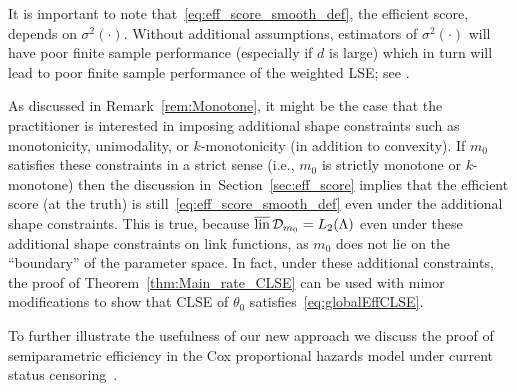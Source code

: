 { %


\begin{remark}\label{rem:Efficency_general} It is important to note that~\eqref{eq:eff_score_smooth_def}, the efficient score, depends on $\sigma^2(\cdot)$.  Without additional assumptions, estimators of $\sigma^2(\cdot)$  will have poor finite sample  performance (especially if $d$ is large) which in turn will lead to  poor finite sample performance of the weighted LSE; see \citet[pages 93-95]{Tsiatis06}. 
\end{remark}

\begin{remark}\label{rem:Efficency_additional}
As discussed in Remark~\ref{rem:Monotone}, it might be the case that the practitioner is interested in {imposing} additional shape constraints such as monotonicity, unimodality, or $k$-monotonicity (in addition to convexity). If $m_0$ satisfies these constraints {in a strict sense} (i.e., $m_0$ is strictly monotone {or} $k$-monotone) then the discussion in~Section~\ref{sec:eff_score} implies that {the efficient score (at the truth) is still~\eqref{eq:eff_score_smooth_def} even under the additional shape constraints}. This is true, because $\overline{\mathrm{lin}}\,\mathcal{D}_{m_0} = L_2(\Lambda)$ even under these additional shape constraints on link functions, as $m_0$ does not lie {on} the ``boundary'' of the parameter space. In fact, under these additional constraints, the proof of Theorem~\ref{thm:Main_rate_CLSE} can be used with minor modifications to show that CLSE of $\theta_0$ satisfies~\eqref{eq:globalEffCLSE}.
\end{remark}

To further illustrate the usefulness of our new approach we discuss the proof of semiparametric efficiency in the Cox proportional hazards model under  current status censoring~\cite{MR1394975,VdV02}. 

}
